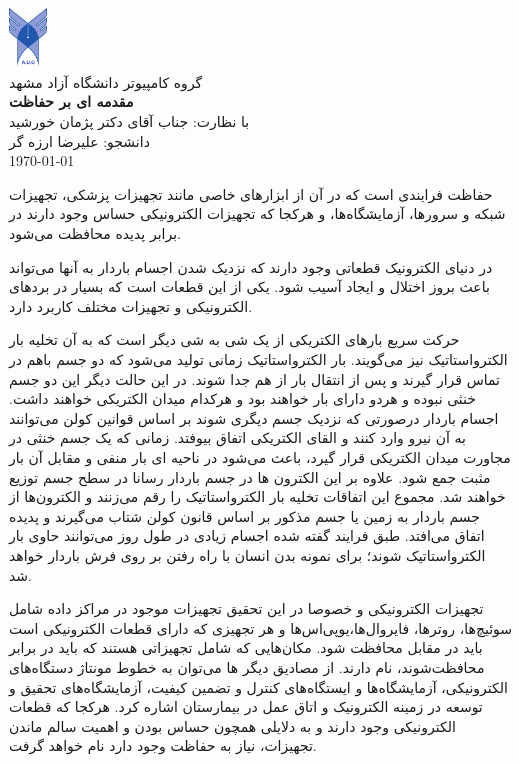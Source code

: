 \documentclass[a4paper]{article}
\begin{document}
\begin{center}
{\includegraphics[width=1cm]{logo.png}}\\[0.5cm]
گروه کامپیوتر دانشگاه آزاد مشهد\\[0.4cm]
{\LARGE \textbf{مقدمه ای بر حفاظت }}\\[0.4cm]
با نظارت: جناب آقای دکتر پژمان خورشید\\[0.4cm]
دانشجو: علیرضا ارزه گر\\[0.4cm]
\today\\[1cm]
\end{center}

حفاظت 
فرایندی است که در آن از ابزارهای خاصی مانند تجهیزات پزشکی، تجهیزات شبکه و سرورها، آزمایشگاه‌ها،
و هرکجا که تجهیزات الکترونیکی حساس وجود دارند در برابر پدیده 
محافظت می‌شود.

در دنیای الکترونیک قطعاتی وجود دارند که نزدیک شدن اجسام باردار به آنها می‌تواند باعث بروز اختلال و ایجاد
آسیب شود. یکی از این قطعات  است که بسیار در بردهای الکترونیکی و تجهیزات مختلف کاربرد دارد.

حرکت سریع بارهای الکتریکی از یک شی به شی دیگر است که به آن تخلیه بار الکترواستاتیک نیز می‌گویند.
بار الکترواستاتیک زمانی تولید می‌شود که دو جسم باهم در تماس قرار گیرند و پس از انتقال بار از هم جدا شوند.
در این حالت دیگر این دو جسم خنثی نبوده و هردو دارای بار خواهند بود و هرکدام میدان الکتریکی خواهند داشت.
اجسام باردار درصورتی که نزدیک جسم دیگری شوند بر اساس قوانین کولن می‌توانند به آن نیرو وارد کنند
و القای الکتریکی اتفاق بیوفتد. زمانی که یک جسم خنثی در مجاورت میدان الکتریکی قرار گیرد،
باعث می‌شود در ناحیه ای بار منفی و مقابل آن بار مثبت جمع شود. علاوه بر این الکترون ها در جسم باردار رسانا
در سطح جسم توزیع خواهند شد. مجموع این اتفاقات تخلیه بار الکترواستاتیک را رقم می‌زنند و الکترون‌ها از جسم باردار به
زمین یا جسم مذکور بر اساس قانون کولن شتاب می‌گیرند و پدیده  اتفاق می‌افتد.
طبق فرایند گفته شده اجسام زیادی در طول روز می‌توانند حاوی بار الکترواستاتیک شوند؛ برای نمونه بدن انسان با راه رفتن بر روی فرش
باردار خواهد شد.

تجهیزات الکترونیکی و خصوصا در این تحقیق تجهیزات موجود در مراکز داده
شامل سوئیچ‌ها، روترها، فایروال‌ها،یو‌پی‌اس‌ها و هر تجهیزی که دارای قطعات الکترونیکی است باید در مقابل  محافظت شود.
مکان‌هایی که شامل تجهیزاتی هستند که باید در برابر  محافظت‌شوند، 
نام دارند. از مصادیق دیگر  ها می‌توان به خطوط مونتاژ دستگاه‌های الکترونیکی، آزمایشگاه‌ها و ایستگاه‌های کنترل و تضمین کیفیت،
 آزمایشگاه‌های تحقیق و توسعه در زمینه الکترونیک و اتاق عمل در بیمارستان اشاره کرد. هرکجا که قطعات الکترونیکی وجود دارند و به دلایلی همچون
حساس بودن و اهمیت سالم ماندن تجهیزات، نیاز به حفاظت  وجود دارد  نام خواهد گرفت.
\end{document}
